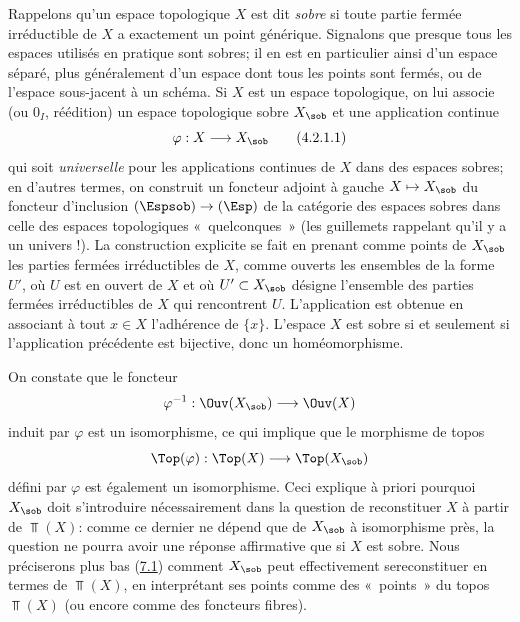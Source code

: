 \documentclass[10pt]{../fichiers-configuration-latex/smfart}
\begin{document}
\subsubsection{}
Rappelons qu'un espace topologique $X$ est dit \emph{sobre} si toute
partie fermée irréductible de $X$ a exactement un point
générique. Signalons que presque tous les espaces utilisés en
pratique sont sobres; il en est en particulier ainsi d'un espace
séparé, plus généralement d'un espace dont tous les points
sont fermés, ou de l'espace sous-jacent à un schéma. Si $X$
est un espace topologique, on lui associe (\loccit ou \EGA
$0_I$, réédition) un espace topologique sobre $X_{\sob}$
et une application continue\pageoriginale
\begin{equation*}
\varphi: X\longrightarrow X_{\sob}\tag{4.2.1.1}
\end{equation*}
qui soit \emph{universelle} pour les applications continues de $X$
dans des espaces sobres; en d'autres termes, on construit un
foncteur adjoint à gauche $X\mapsto X_{\sob}$ du foncteur
d'inclusion $(\Espsob)\rightarrow (\Esp)$ de la catégorie des
espaces sobres dans celle des espaces topologiques
« quelconques » (les guillemets rappelant qu'il y a un univers !). La
construction explicite se fait en prenant comme points de $X_{\sob}$
les parties fermées irréductibles de $X$, comme ouverts les
ensembles de la forme $U'$, où $U$ est en ouvert de $X$ et où
$U'\subset X_{\sob}$ désigne l'ensemble des parties fermées
irréductibles de $X$ qui rencontrent $U$. L'application
 est obtenue en associant à tout $x\in X$
l'adhérence de $\{x\}$. L'espace $X$ est sobre si et seulement si
l'application précédente est bijective, donc un
homéomorphisme.

On constate que le foncteur
$$
\varphi^{-1}:\Ouv(X_{\sob})\longrightarrow \Ouv(X)
$$
induit par $\varphi$ est un isomorphisme, ce qui implique que le
morphisme de topos
$$
\Top(\varphi):\Top(X)\longrightarrow \Top(X_{\sob})
$$
défini par $\varphi$ est également un isomorphisme. Ceci explique à
priori pourquoi $X_{\sob}$ doit s'introduire nécessairement dans la
question de reconstituer $X$ à partir de $\Top(X)$: comme ce dernier
ne dépend que de $X_{\sob}$ à isomorphisme près, la question ne
pourra avoir une réponse affirmative que si $X$ est sobre. Nous
préciserons plus bas (\hyperref[IV.subsec7.1]{7.1}) comment $X_{\sob}$ peut
effectivement se\pageoriginale reconstituer en termes de $\Top(X)$,
en interprétant ses points comme des « points »  du topos
$\Top(X)$ (ou encore comme des foncteurs fibres).
\end{document}

